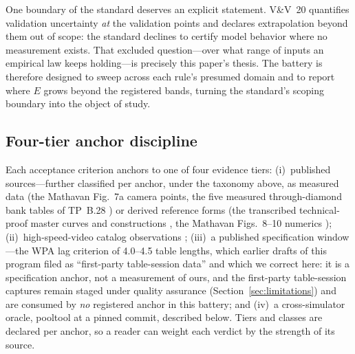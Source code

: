 One boundary of the standard deserves an explicit statement. V\&V~20
quantifies validation uncertainty \emph{at} the validation points and
declares extrapolation beyond them out of scope: the standard declines to
certify model behavior where no measurement exists. That excluded
question---over what range of inputs an empirical law keeps holding---is
precisely this paper's thesis. The battery is therefore designed to sweep
across each rule's presumed domain and to report where $E$ grows beyond the
registered bands, turning the standard's scoping boundary into the object of
study.

\subsection{Four-tier anchor discipline}

Each acceptance criterion anchors to one of four evidence tiers:
(i)~published sources---further classified per anchor, under the taxonomy
above, as measured data (the Mathavan Fig.~7a camera points, the five
measured through-diamond bank tables of TP~B.28 \citep{alciatore_tp_b28})
or derived reference forms (the transcribed technical-proof master curves
and constructions \citep{alciatore_tp_a14}, the Mathavan Figs.~8--10
numerics \citep{mathavan2010cushion});
(ii)~high-speed-video catalog observations \citep{alciatore_hsv_catalog};
(iii)~a published specification window---the WPA lag criterion of 4.0--4.5
table lengths, which earlier drafts of this program filed as
``first-party table-session data'' and which we correct here: it is a
specification anchor, not a measurement of ours, and the first-party
table-session captures remain staged under quality assurance
(Section~\ref{sec:limitations}) and are consumed by \emph{no} registered
anchor in this battery; and (iv)~a cross-simulator oracle, pooltool
\citep{kiefl2024pooltool} at a pinned commit, described below. Tiers and
classes are declared per anchor, so a reader can weight each verdict by
the strength of its source.

